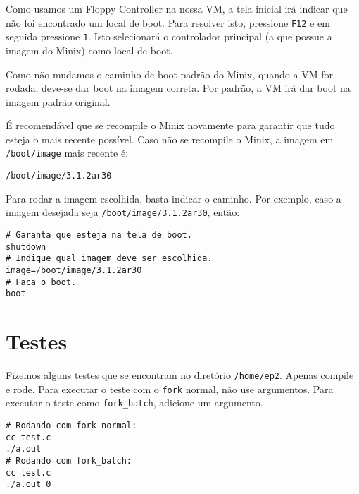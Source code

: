 \documentclass{amsart}
\theoremstyle{plain}
\newcommand{\code}[1]{\lstinline[mathescape=true]{#1}}
\begin{document}
Como usamos um Floppy Controller na nossa VM, a tela inicial irá indicar que não foi encontrado um
local de boot. Para resolver isto, pressione \code{F12} e em seguida pressione \code{1}. Isto
selecionará o controlador principal (a que possue a imagem do Minix) como local de boot.

Como não mudamos o caminho de boot padrão do Minix, quando a VM for rodada, deve-se dar boot na
imagem correta. Por padrão, a VM irá dar boot na imagem padrão original.

É recomendável que se recompile o Minix novamente para garantir que tudo esteja o mais recente
possível. Caso não se recompile o Minix, a imagem em \code{/boot/image} mais recente é:

\begin{lstlisting}[frame=leftline,mathescape=true,style=nonumbers]
/boot/image/3.1.2ar30
\end{lstlisting}

Para rodar a imagem escolhida, basta indicar o caminho. Por exemplo, caso a imagem desejada seja
\code{/boot/image/3.1.2ar30}, então:

\begin{lstlisting}[frame=leftline,mathescape=true,style=nonumbers]
# Garanta que esteja na tela de boot.
shutdown
# Indique qual imagem deve ser escolhida.
image=/boot/image/3.1.2ar30
# Faca o boot.
boot
\end{lstlisting}

\section{Testes}

Fizemos alguns testes que se encontram no diretório \code{/home/ep2}. Apenas compile e rode. Para
executar o teste com o \code{fork} normal, não use argumentos. Para executar o teste como
\code{fork_batch}, adicione um argumento.

\begin{lstlisting}[frame=leftline,mathescape=true,style=nonumbers]
# Rodando com fork normal:
cc test.c
./a.out
# Rodando com fork_batch:
cc test.c
./a.out 0
\end{lstlisting}
\end{document}
